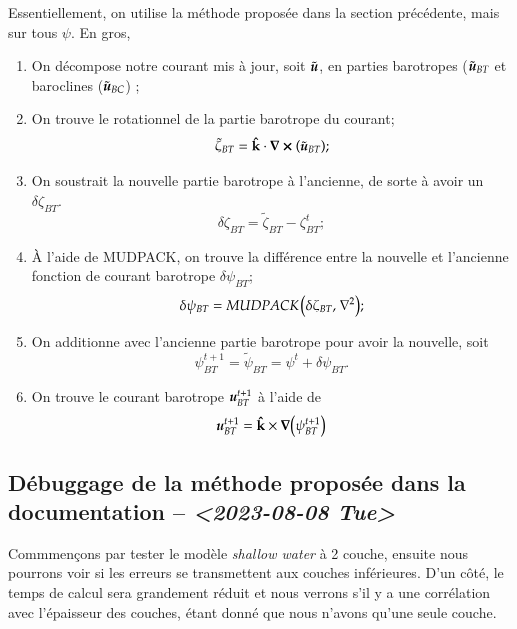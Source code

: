\documentclass[10pt]{article}
\numberwithin{equation}{section}
\newcommand{\kvf}{\vb{\hat{k}}}
\newcommand{\uu}{\vb*{u}}
\newcommand{\pt}{\hspace{1pt}} %
\begin{document}
Essentiellement, on utilise la méthode proposée dans la section précédente, mais sur tous \(\psi\).
En gros,
\begin{enumerate}
\item On décompose notre courant mis à jour, soit \(\tilde{\uu}\), en parties barotropes (\(\tilde{\uu}_{BT}\) et baroclines (\(\tilde{\uu}_{BC}\)) ;
\item On trouve le rotationnel de la partie barotrope du courant;
\begin{equation}
   \tilde{\zeta}_{BT} = \kvf\cdot\curl(\tilde{\uu}_{BT});
\end{equation}
\item On soustrait la nouvelle partie barotrope à l'ancienne, de sorte à avoir un \(\delta \zeta_{BT}\).
\begin{equation}
   \delta \zeta_{BT} = \tilde{\zeta}_{BT} - \zeta_{BT}^t;
\end{equation}
\item À l'aide de MUDPACK, on trouve la différence entre la nouvelle et l'ancienne fonction de courant barotrope \(\delta \psi_{BT}\);
\begin{equation}
   \delta \psi_{BT} = MUDPACK \pt \qty(\delta \zeta_{BT},\pt \laplacian{});
\end{equation}
\item On additionne avec l'ancienne partie barotrope pour avoir la nouvelle, soit
\begin{equation}
   \psi^{t+1}_{BT} = \tilde{\psi}_{BT} = \psi^{t} + \delta \psi_{BT}.
\end{equation}
\item On trouve le courant barotrope \(\uu^{t+1}_{BT}\) à l'aide de
\begin{equation}
   \uu^{t+1}_{BT} = \kvf\times\gradient(\psi^{t+1}_{BT})
\end{equation}
\end{enumerate}

\subsection{Débuggage de la méthode proposée dans la documentation -- \textit{<2023-08-08 Tue>}}
\label{sec:orgdf7e809}

Commmençons par tester le modèle \emph{shallow water} à 2 couche, ensuite nous pourrons voir si les erreurs se transmettent aux couches inférieures.
D'un côté, le temps de calcul sera grandement réduit et nous verrons s'il y a une corrélation avec l'épaisseur des couches, étant donné que nous n'avons qu'une seule couche.\bigskip
\end{document}
